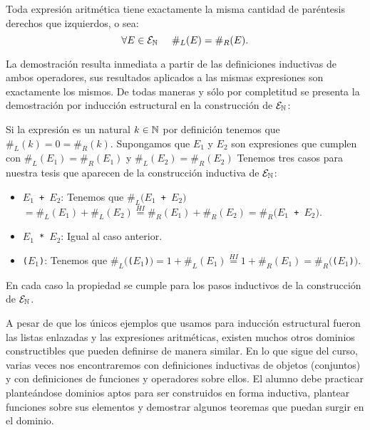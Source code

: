 	\begin{teorema}
	Toda expresión aritmética tiene exactamente la misma cantidad de paréntesis derechos que izquierdos, o sea:
	\[
	\forall E\in\mathcal{E}_{\mathbb{N}}\;\;\;\;\; \#_L(E)=\#_R(E).
	\]
	\begin{demostracion}
	La demostración resulta inmediata a partir de las definiciones inductivas de ambos operadores, sus resultados aplicados a las mismas expresiones son exactamente los mismos.
	De todas maneras y sólo por completitud se presenta la demostración por inducción estructural en la construcción de $\mathcal{E}_{\mathbb{N}}$:
	\begin{inducciondemo}
	  \BI Si la expresión es un natural $k\in\mathbb{N}$ por definición tenemos que $\#_L(k)=0=\#_R(k)$.
	  \HI Supongamos que $E_1$ y $E_2$ son expresiones que cumplen con $\#_L(E_1)=\#_R(E_1)$ y $\#_L(E_2)=\#_R(E_2)$
	  \TI Tenemos tres casos para nuestra tesis que aparecen de la construcción inductiva de $\mathcal{E}_{\mathbb{N}}$:
	  \begin{itemize}
	    \item \texttt{$E_1$ + $E_2$}: Tenemos que \texttt{$\#_L(E_1$ + $E_2)$}$=\#_L(E_1) + \#_L(E_2)\stackrel{HI}{=}\#_R(E_1) + \#_R(E_2)=$\texttt{$\#_R(E_1$ + $E_2)$}.
	    \item \texttt{$E_1$ * $E_2$}: Igual al caso anterior.
	    \item \texttt{($E_1$)}: Tenemos que \texttt{$\#_L($($E_1$)$)=1+\#_L(E_1)\stackrel{HI}{=}1+\#_R(E_1)=\#_R($($E_1$)$)$}.
	  \end{itemize}
	\end{inducciondemo}
	En cada caso la propiedad se cumple para los pasos inductivos de la construcción de $\mathcal{E}_{\mathbb{N}}$.
	\end{demostracion}
	\end{teorema}
	  
A pesar de que los únicos ejemplos que usamos para inducción estructural fueron las listas enlazadas y las expresiones aritméticas, existen muchos otros dominios constructibles que pueden definirse de manera similar.
En lo que sigue del curso, varias veces nos encontraremos con definiciones inductivas de objetos (conjuntos) y con definiciones de funciones y operadores sobre ellos.
El alumno debe practicar planteándose dominios aptos para ser construidos en forma inductiva, plantear funciones sobre sus elementos y demostrar algunos teoremas que puedan surgir en el dominio.